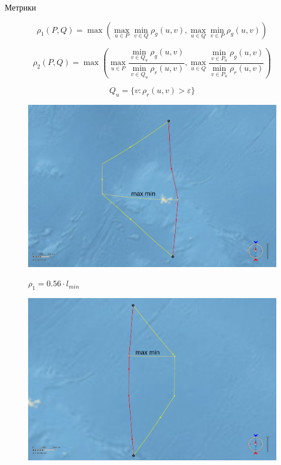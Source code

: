 \documentclass[russian, hyperref={unicode}]{beamer}
\theoremstyle{definition}
\begin{document}
\begin{frame}{Метрики}
     {
        \begin{equation*}
            \rho_1 (P, Q) = \max(\max_{u \in P} \min_{v \in Q} \rho_g(u,
            v), \max_{u \in Q} \min_{v \in P} \rho_g(u, v))
        \end{equation*}

        \begin{equation*}
            \rho_2 (P, Q) = \max(\max_{u \in P} \frac{\min\limits_{v \in Q_u}
            \rho_g(u, v)}{\min\limits_{v \in Q_u} \rho_r(u, v)}, \max\limits_{u \in Q} \frac{\min\limits_{v \in P_u}
            \rho_g(u, v)}{\min\limits_{v \in P_u} \rho_r(u, v)})
        \end{equation*}
        
        \begin{equation*}
            Q_u = \{ v : \rho_r(u, v) > \varepsilon \}
        \end{equation*}
    }
     {
        \begin{figure}
            \includegraphics[width=.9\textwidth]{rho1-dissimilar}
            
            $\rho_1 = 0.56 \cdot l_{min}$
        \end{figure}
    }
     {
        \begin{figure}
            \includegraphics[width=.9\textwidth]{rho1-dissimilar-rho2-similar}
            

\end{figure}}
\end{frame}
\end{document}
